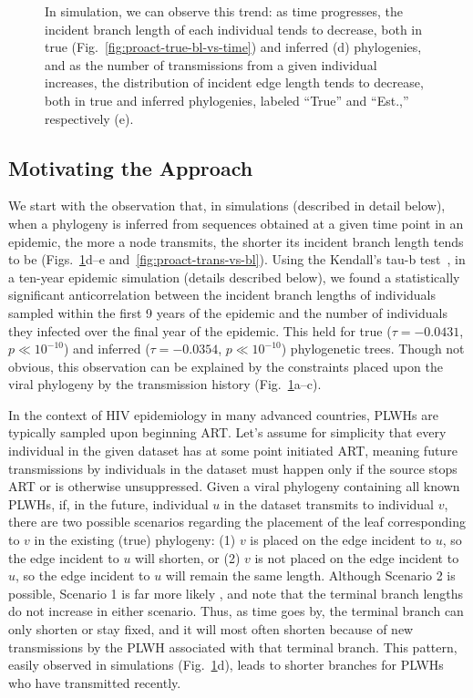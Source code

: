 \begin{figure}
{In simulation, we can observe this trend: as time progresses, the incident branch length of each individual tends to decrease, both in true (Fig.~\ref{fig:proact-true-bl-vs-time}) and inferred (d) phylogenies, and as the number of transmissions from a given individual increases, the distribution of incident edge length tends to decrease, both in true and inferred phylogenies, labeled ``True'' and ``Est.,'' respectively (e).}
\label{fig:proact-diagram}
\end{figure}

\subsection{Motivating the Approach}
We start with the observation that, in simulations (described in detail below), when a phylogeny is inferred from sequences obtained at a given time point in an epidemic,
the more a node transmits, the shorter its incident branch length tends to be (Figs.~\ref{fig:proact-diagram}d--e and~\ref{fig:proact-trans-vs-bl}). Using the Kendall's tau-b test~\cite{Kendall1938}, in a ten-year epidemic simulation (details described below), we found a statistically significant anticorrelation between the incident branch lengths of individuals sampled within the first 9 years of the epidemic and the number of individuals they infected over the final year of the epidemic. This held for true ($\tau=-0.0431$, $p\ll 10^{-10}$) and inferred ($\tau=-0.0354$, $p\ll 10^{-10}$) phylogenetic trees. Though not obvious, this observation can be explained by the constraints placed upon the viral phylogeny by the transmission history (Fig.~\ref{fig:proact-diagram}a--c).

In the context of \gls{HIV} epidemiology in many advanced countries, \glspl{PLWH} are typically sampled upon beginning \gls{ART}. Let's assume for simplicity that every individual in the given dataset has at some point initiated \gls{ART}, meaning future transmissions by individuals in the dataset must happen only if the source stops \gls{ART} or is otherwise unsuppressed. Given a viral phylogeny containing all known \glspl{PLWH}, if, in the future, individual $u$ in the dataset transmits to individual $v$, there are two possible scenarios regarding the placement of the leaf corresponding to $v$ in the existing (true) phylogeny: (1) $v$ is placed on the edge incident to $u$, so the edge incident to $u$ will shorten, or (2) $v$ is not placed on the edge incident to $u$, so the edge incident to $u$ will remain the same length. Although Scenario 2 is possible, Scenario 1 is far more likely \cite{Romero-Severson2016}, and note that the terminal branch lengths do not increase in either scenario. Thus, as time goes by, the terminal branch can only shorten or stay fixed, and it will most often shorten because of new transmissions by the \gls{PLWH} associated with that terminal branch. This pattern, easily observed in simulations (Fig.~\ref{fig:proact-diagram}d), leads to shorter branches for \glspl{PLWH} who have transmitted recently.

